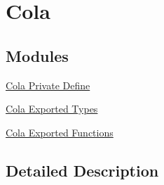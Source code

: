 \hypertarget{group___cola}{}\section{Cola}
\label{group___cola}
\subsection*{Modules}
\begin{DoxyCompactItemize}
\item 
\hyperlink{group___cola___private___define}{Cola Private Define}
\item 
\hyperlink{group___cola___exported___types}{Cola Exported Types}
\item 
\hyperlink{group___cola___exported___functions}{Cola Exported Functions}
\end{DoxyCompactItemize}


\subsection{Detailed Description}
